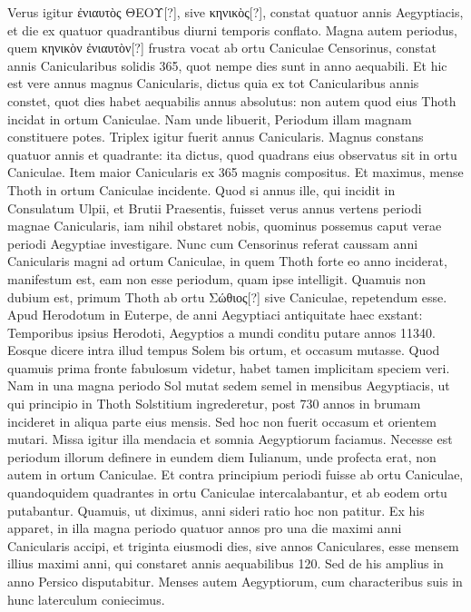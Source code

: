 Verus igitur \textgreek{ἐνιαυτὸς ΘΕΟΥ}[?], sive \textgreek{κηνικὸς}[?],
constat quatuor annis Aegyptiacis, et die ex quatuor quadrantibus
diurni temporis conflato.
Magna autem periodus, quem \textgreek{κηνικὸν
ἐνιαυτὸν}[?] frustra vocat ab ortu Caniculae Censorinus,
 constat annis Canicularibus
solidis 365, quot nempe dies sunt in anno aequabili.
Et hic est vere annus magnus Canicularis,
 dictus quia ex tot Canicularibus
annis constet, quot dies habet aequabilis annus absolutus:
non autem quod eius Thoth incidat in ortum Caniculae.
Nam
unde libuerit, Periodum illam magnam constituere potes.
Triplex
igitur fuerit annus Canicularis.
Magnus constans quatuor annis et
quadrante: ita dictus, quod quadrans eius observatus sit in ortu Caniculae.
Item maior Canicularis ex 365 magnis compositus.
Et maximus, mense Thoth in ortum Caniculae incidente.
Quod si annus
ille, qui incidit in Consulatum Ulpii, et Brutii Praesentis, fuisset verus
annus vertens periodi magnae Canicularis, iam nihil obstaret
nobis, quominus possemus caput verae periodi Aegyptiae investigare.
Nunc cum Censorinus referat caussam anni Canicularis
magni ad ortum Caniculae, in quem Thoth forte eo anno inciderat,
manifestum est, eam non esse periodum, quam ipse intelligit.
Quamuis non dubium est, primum Thoth ab ortu \textgreek{Σώθιος}[?] sive
Caniculae, repetendum esse.
Apud Herodotum in Euterpe, de anni
Aegyptiaci antiquitate haec exstant: Temporibus ipsius Herodoti,
Aegyptios a mundi conditu putare annos 11340.
Eosque dicere intra
illud tempus Solem bis ortum, et occasum mutasse.
Quod quamuis
prima fronte fabulosum videtur, habet tamen implicitam speciem
veri.
%
Nam in una magna periodo Sol mutat sedem semel in mensibus
Aegyptiacis, ut qui principio in Thoth Solstitium ingrederetur,
post 730 annos in brumam incideret in aliqua parte eius mensis.
Sed
hoc non fuerit occasum et orientem mutari.
Missa igitur illa mendacia et somnia
Aegyptiorum faciamus.
Necesse est periodum
illorum definere in eundem diem Iulianum,
unde profecta erat, non autem in
ortum Caniculae.
Et contra principium
periodi fuisse ab ortu Caniculae, quandoquidem
quadrantes in ortu Caniculae intercalabantur,
et ab eodem ortu putabantur.
Quamuis, ut diximus, anni sideri ratio
hoc non patitur.
Ex his apparet, in
illa magna periodo quatuor annos pro
una die maximi anni Canicularis accipi,
et triginta eiusmodi dies, sive annos Caniculares,
esse mensem illius maximi anni, qui constaret annis aequabilibus
120.
Sed de his amplius in anno Persico disputabitur.
Menses autem Aegyptiorum, cum characteribus suis in hunc laterculum
coniecimus.
%
\begin{table}[tb]
  
\end{table}
%
